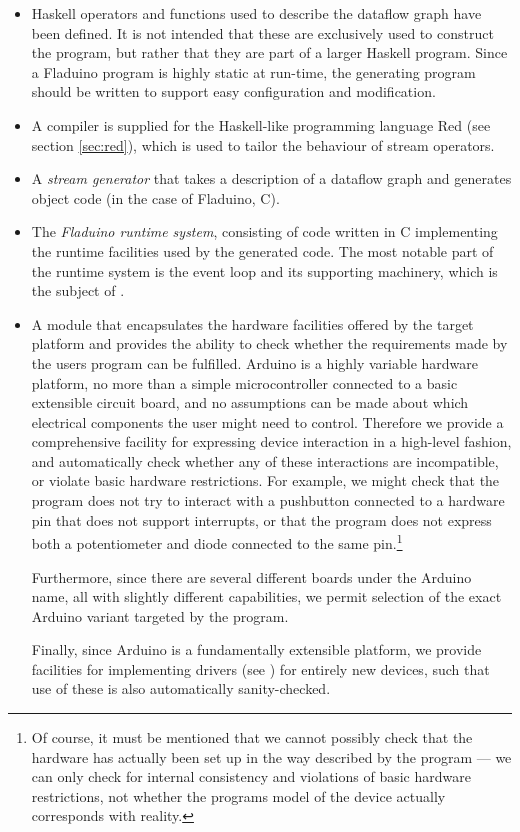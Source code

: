 \documentclass[a4paper, oneside, final]{memoir}
\let\fref\undefined
\let\Fref\undefined
\begin{document}
\begin{itemize}
\item Haskell operators and functions used to describe the dataflow
  graph have been defined.  It is not intended that these are
  exclusively used to construct the program, but rather that they are
  part of a larger Haskell program.  Since a Fladuino program is
  highly static at run-time, the generating program should be written
  to support easy configuration and modification.
\item A compiler is supplied for the Haskell-like programming language
  Red (see section \ref{sec:red}), which is used to tailor the
  behaviour of stream operators.
\item A \textit{stream generator} that takes a description of a
  dataflow graph and generates object code (in the case of Fladuino,
  C).
\item The \textit{Fladuino runtime system}, consisting of code written
  in C implementing the runtime facilities used by the generated code.
  The most notable part of the runtime system is the event loop and
  its supporting machinery, which is the subject of
  \Fref{sec:dataflowevaluationstrategy}.
\item A module that encapsulates the hardware facilities offered by
  the target platform and provides the ability to check whether the
  requirements made by the users program can be fulfilled.  Arduino is
  a highly variable hardware platform, no more than a simple
  microcontroller connected to a basic extensible circuit board, and
  no assumptions can be made about which electrical components the
  user might need to control.  Therefore we provide a comprehensive
  facility for expressing device interaction in a high-level fashion,
  and automatically check whether any of these interactions are
  incompatible, or violate basic hardware restrictions.  For example,
  we might check that the program does not try to interact with a
  pushbutton connected to a hardware pin that does not support
  interrupts, or that the program does not express both a
  potentiometer and diode connected to the same pin.\footnote{Of
    course, it must be mentioned that we cannot possibly check that
    the hardware has actually been set up in the way described by the
    program --- we can only check for internal consistency and
    violations of basic hardware restrictions, not whether the
    programs model of the device actually corresponds with reality.}

  Furthermore, since there are several different boards under the
  Arduino name, all with slightly different capabilities, we permit
  selection of the exact Arduino variant targeted by the program.

  Finally, since Arduino is a fundamentally extensible platform, we provide
  facilities for implementing drivers (see \fref{sec:user-extens-abstr} ) for
  entirely new devices, such that use of these is also automatically
  sanity-checked.
\end{itemize}
\end{document}
